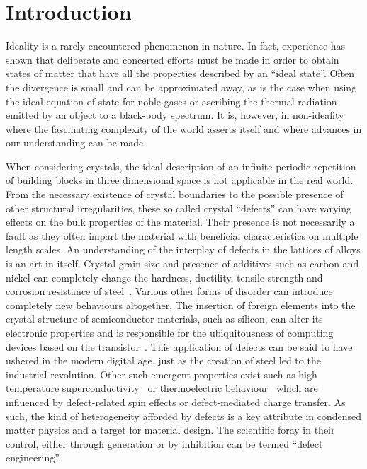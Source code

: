
\section{Introduction}

Ideality is a rarely encountered phenomenon in nature. In fact,
experience has shown that deliberate and concerted efforts 
must be made in order to obtain states of matter that have all
the properties described by an ``ideal state''.
Often the divergence is small and can be approximated 
away, as is the case when using the ideal equation of state for 
noble gases or ascribing the thermal radiation emitted by an object
to a black-body spectrum. It is, however, in non-ideality where the 
fascinating complexity of the world asserts itself and where 
advances in our understanding can be made. 

When considering crystals, the ideal description of an infinite
periodic repetition of building blocks in three dimensional space is
not applicable in the real world. From the necessary existence of 
crystal boundaries to the possible presence of other structural
irregularities, these so called crystal ``defects'' can have
varying effects on the bulk properties of the material.
Their presence is not necessarily a fault as
they often impart the material with beneficial characteristics
on multiple length scales.
An understanding of the interplay of defects in the 
lattices of alloys is an art in itself.
Crystal grain size and presence of additives such as 
carbon and nickel can completely change the hardness, 
ductility, tensile strength and corrosion resistance
of steel~\cite{reed-hillPhysicalMetallurgyPrinciples1992}. 
Various other forms 
of disorder can introduce completely new behaviours altogether.
The insertion of foreign elements into the crystal structure
of semiconductor materials, such as silicon, can alter its 
electronic properties and is responsible for the ubiquitousness
of computing devices based on the 
transistor~\cite{levyMicroelectronicMaterialsProcesses1989}. 
This application
of defects can be said to have ushered in the modern digital age,
just as the creation of steel led to the industrial revolution.
Other such emergent properties exist such as high temperature 
superconductivity~\cite{leggettWhatWeKnow2006} or thermoelectric 
behaviour~\cite{peiBandEngineeringThermoelectric2012} which are influenced
by defect-related spin effects or defect-mediated charge transfer.
As such, the kind of heterogeneity afforded by defects is a key attribute 
in condensed matter physics and a target for material design.
The scientific foray in their control, either through generation or
by inhibition can be termed ``defect engineering''.

